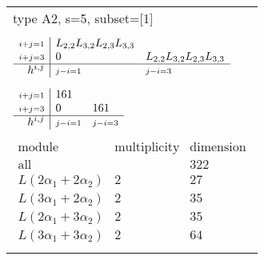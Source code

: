 \documentclass[crop,border=2mm]{standalone}
\begin{document}
\begin{tabular}{l}
{\huge type A2, s=5, subset=[1]}\\ \\


$\displaystyle
\begin{array}{r|l l}
	{\scriptstyle i+j=1}&L_{2,2}L_{3,2}L_{2,3}L_{3,3}&\\
	{\scriptstyle i+j=3}&0&L_{2,2}L_{3,2}L_{2,3}L_{3,3}\\
	\hline h^{i,j}&{\scriptstyle j-i=1}&{\scriptstyle j-i=3}
\end{array}
$ \\ \\


$\displaystyle
\begin{array}{r|l l}
	{\scriptstyle i+j=1}&161&\\
	{\scriptstyle i+j=3}&0&161\\
	\hline h^{i,j}&{\scriptstyle j-i=1}&{\scriptstyle j-i=3}
\end{array}
$ \\ \\


$\displaystyle
\begin{array}{rll}
	\text{module}&\text{multiplicity}&\text{dimension} \\ \hline \text{all}&&322 \\
	L\left( 2\alpha_{1}+ 2\alpha_{2}\right)&2&27\\
	L\left( 3\alpha_{1}+ 2\alpha_{2}\right)&2&35\\
	L\left( 2\alpha_{1}+ 3\alpha_{2}\right)&2&35\\
	L\left( 3\alpha_{1}+ 3\alpha_{2}\right)&2&64
\end{array}
$ \\ \\

\end{tabular}
\end{document}
